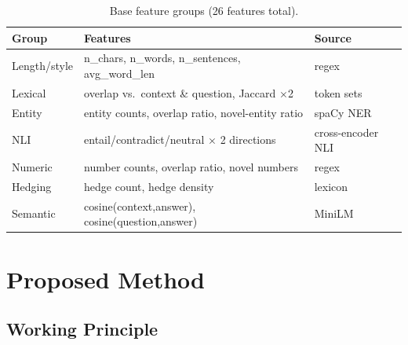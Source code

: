 \documentclass[a4paper,fleqn]{cas-sc}
\begin{document}
\begin{table}[pos=htbp]
  \centering
  \caption{Base feature groups (26 features total).}
  \label{tab:features}
  \begin{tabular}{>{\raggedright\arraybackslash}p{2.1cm}>{\raggedright\arraybackslash}p{4.6cm}>{\raggedright\arraybackslash}p{4.4cm}}
    \toprule
    \textbf{Group} & \textbf{Features}                                   & \textbf{Source}   \\
    \midrule
    Length/style   & n\_chars, n\_words, n\_sentences, avg\_word\_len    & regex             \\
    Lexical        & overlap vs.\ context \& question, Jaccard $\times$2 & token sets        \\
    Entity         & entity counts, overlap ratio, novel-entity ratio    & spaCy NER         \\
    NLI            & entail/contradict/neutral $\times$ 2 directions     & cross-encoder NLI \\
    Numeric        & number counts, overlap ratio, novel numbers         & regex             \\
    Hedging        & hedge count, hedge density                          & lexicon           \\
    Semantic       & cosine(context,answer), cosine(question,answer)     & MiniLM            \\
    \bottomrule
  \end{tabular}
\end{table}

\section{Proposed Method}\label{sec:proposed}

\subsection{Working Principle}
\end{document}
